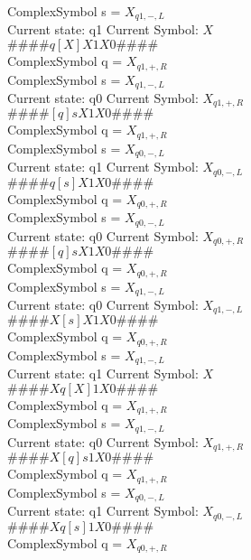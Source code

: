 \documentclass[10pt, a4paper]{article}
\begin{document}
ComplexSymbol s = $X_{q1,-,L}$ \\ 
 \medskip
Current state: q1	 Current Symbol: 	 $X$\\
$\# \#\# \# q [ X ] X 1 X 0 \# \# \# \# $ \\
ComplexSymbol q = $X_{q1,+,R}$ \\
ComplexSymbol s = $X_{q1,-,L}$ \\ 
 \medskip
Current state: q0	 Current Symbol: 	 $X_{q1,+,R}$\\
$\# \#\# \# [ q ] s X 1 X 0 \# \# \# \# $ \\
ComplexSymbol q = $X_{q1,+,R}$ \\
ComplexSymbol s = $X_{q0,-,L}$ \\ 
 \medskip
Current state: q1	 Current Symbol: 	 $X_{q0,-,L}$\\
$\# \#\# \# q [ s ] X 1 X 0 \# \# \# \# $ \\
ComplexSymbol q = $X_{q0,+,R}$ \\
ComplexSymbol s = $X_{q0,-,L}$ \\ 
 \medskip
Current state: q0	 Current Symbol: 	 $X_{q0,+,R}$\\
$\# \#\# \# [ q ] s X 1 X 0 \# \# \# \# $ \\
ComplexSymbol q = $X_{q0,+,R}$ \\
ComplexSymbol s = $X_{q1,-,L}$ \\ 
 \medskip
Current state: q0	 Current Symbol: 	 $X_{q1,-,L}$\\
$\# \#\# \# X [ s ] X 1 X 0 \# \# \# \# $ \\
ComplexSymbol q = $X_{q0,+,R}$ \\
ComplexSymbol s = $X_{q1,-,L}$ \\ 
 \medskip
Current state: q1	 Current Symbol: 	 $X$\\
$\# \#\# \# X q [ X ] 1 X 0 \# \# \# \# $ \\
ComplexSymbol q = $X_{q1,+,R}$ \\
ComplexSymbol s = $X_{q1,-,L}$ \\ 
 \medskip
Current state: q0	 Current Symbol: 	 $X_{q1,+,R}$\\
$\# \#\# \# X [ q ] s 1 X 0 \# \# \# \# $ \\
ComplexSymbol q = $X_{q1,+,R}$ \\
ComplexSymbol s = $X_{q0,-,L}$ \\ 
 \medskip
Current state: q1	 Current Symbol: 	 $X_{q0,-,L}$\\
$\# \#\# \# X q [ s ] 1 X 0 \# \# \# \# $ \\
ComplexSymbol q = $X_{q0,+,R}$ \\
\end{document}
